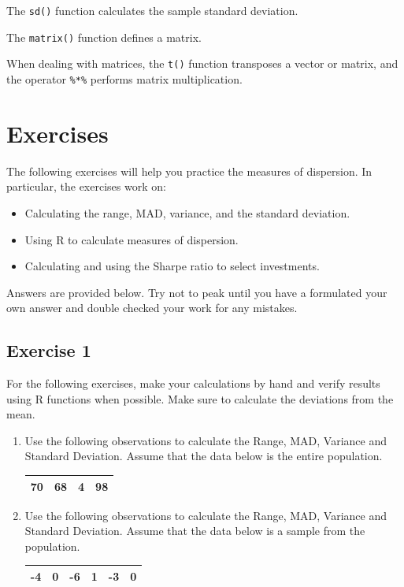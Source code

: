 \documentclass[
  letterpaper,
  DIV=11,
  numbers=noendperiod]{scrreprt}
\begin{document}
The \texttt{sd()} function calculates the sample standard deviation.

The \texttt{matrix()} function defines a matrix.

When dealing with matrices, the \texttt{t()} function transposes a
vector or matrix, and the operator \texttt{\%*\%} performs matrix
multiplication.

\hypertarget{exercises-3}{%
\section{Exercises}\label{exercises-3}}

The following exercises will help you practice the measures of
dispersion. In particular, the exercises work on:

\begin{itemize}
\item
  Calculating the range, MAD, variance, and the standard deviation.
\item
  Using R to calculate measures of dispersion.
\item
  Calculating and using the Sharpe ratio to select investments.
\end{itemize}

Answers are provided below. Try not to peak until you have a formulated
your own answer and double checked your work for any mistakes.

\hypertarget{exercise-1-6}{%
\subsection*{Exercise 1}\label{exercise-1-6}}

For the following exercises, make your calculations by hand and verify
results using R functions when possible. Make sure to calculate the
deviations from the mean.

\begin{enumerate}
\def\labelenumi{\arabic{enumi}.}
\item
  Use the following observations to calculate the Range, MAD, Variance
  and Standard Deviation. Assume that the data below is the entire
  population.

  \begin{longtable}[]{@{}cccc@{}}
  \toprule()
  \endhead
  70 & 68 & 4 & 98 \\
  \bottomrule()
  \end{longtable}
\item
  Use the following observations to calculate the Range, MAD, Variance
  and Standard Deviation. Assume that the data below is a sample from
  the population.

  \begin{longtable}[]{@{}cccccc@{}}
  \toprule()
  \endhead
  -4 & 0 & -6 & 1 & -3 & 0 \\
  \bottomrule()
  \end{longtable}
\end{enumerate}
\end{document}

